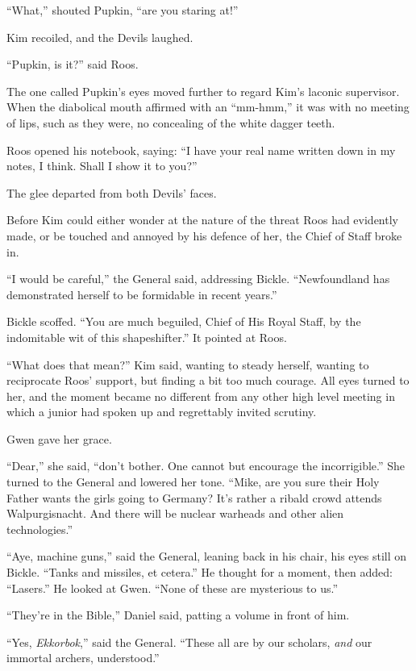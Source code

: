 \documentclass[11pt,a5paper]{article}
\begin{document}
``What,'' shouted Pupkin, ``are you staring at!''

Kim recoiled, and the Devils laughed.

``Pupkin, is it?'' said Roos.

The one called Pupkin's eyes moved further to regard Kim's laconic supervisor. When the diabolical mouth affirmed with an ``mm-hmm,'' it was with no meeting of lips, such as they were, no concealing of the white dagger teeth.

Roos opened his notebook, saying: ``I have your real name written down in my notes, I think. Shall I show it to you?''

The glee departed from both Devils' faces.

Before Kim could either wonder at the nature of the threat Roos had evidently made, or be touched and annoyed by his defence of her, the Chief of Staff broke in.

``I would be careful,'' the General said, addressing Bickle. ``Newfoundland has demonstrated herself to be formidable in recent years.''

Bickle scoffed. ``You are much beguiled, Chief of His Royal Staff, by the indomitable wit of this shapeshifter.'' It pointed at Roos.

``What does that mean?'' Kim said, wanting to steady herself, wanting to reciprocate Roos' support, but finding a bit too much courage. All eyes turned to her, and the moment became no different from any other high level meeting in which a junior had spoken up and regrettably invited scrutiny.

Gwen gave her grace.

``Dear,'' she said, ``don't bother. One cannot but encourage the incorrigible.'' She turned to the General and lowered her tone. ``Mike, are you sure their Holy Father wants the girls going to Germany? It's rather a ribald crowd attends Walpurgisnacht. And there will be nuclear warheads and other alien technologies.''

``Aye, machine guns,'' said the General, leaning back in his chair, his eyes still on Bickle. ``Tanks and missiles, et cetera.'' He thought for a moment, then added: ``Lasers.'' He looked at Gwen. ``None of these are mysterious to us.''

``They're in the Bible,'' Daniel said, patting a volume in front of him.

``Yes, \emph{Ekkorbok},'' said the General. ``These all are by our scholars, \emph{and} our immortal archers, understood.''
\end{document}
